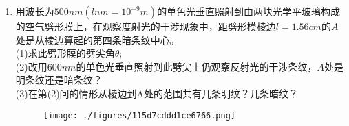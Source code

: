 \begin{enumerate}
(2)长直导线中电流$I=I_0\sin \omega t$，$ABCD$ 不动;\\
(3)长直导线中电流$I=I_0\sin \omega t$，$ABCD$以垂直于导线的速度$v$远离导线匀速运动，位置也如图。
\item 用波长为$ 500nm(lnm=10^{-9}m)$的单色光垂直照射到由两块光学平玻璃构成的空气劈形膜上，在观察度射光的干涉现象中，距劈形模棱边$l=1.56cm$的$A$处是从棱边算起的第四条暗条纹中心。\\
(1)求此劈形膜的劈尖角$\theta$;\\
(2)改用$600nm$的单色光垂直照射到此劈尖上仍观察反射光的干涉条纹，$A$处是明条纹还是暗条纹？\\(3)在第(2)问的情形从棱边到A处的范围共有几条明纹？几条暗纹？
\begin{figure}[ht]
\centering
\texttt{[image: ./figures/115d7cddd1ce6766.png]}
\caption{} \label{fig_BKDP06_1}
\end{figure}
\end{enumerate}